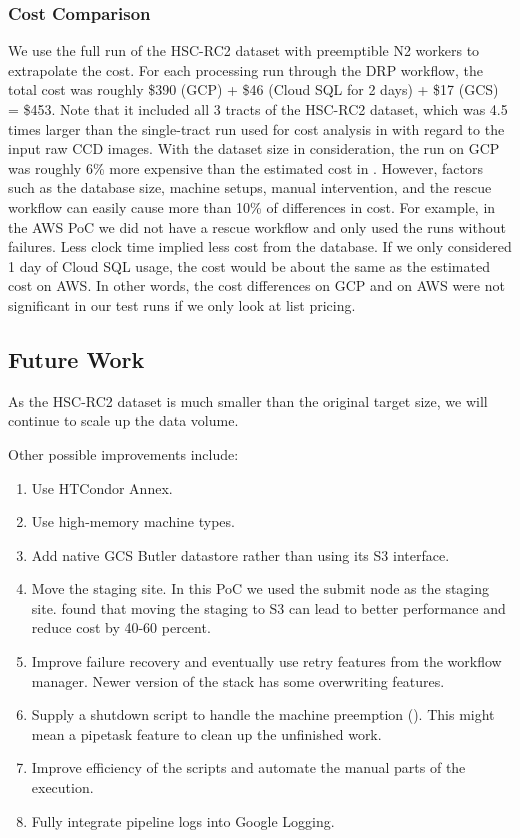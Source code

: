 \subsubsection{Cost Comparison}
We use the full run of the HSC-RC2 dataset with preemptible N2 workers to extrapolate the cost.
For each processing run through the DRP workflow, the total cost was roughly \$390 (GCP) + \$46 (Cloud SQL for 2 days) + \$17 (GCS) = \$453.
Note that it included all 3 tracts of the HSC-RC2 dataset, which was 4.5 times larger than the single-tract run used for cost analysis in  with regard to the input raw CCD images.
With the dataset size in consideration, the run on GCP was roughly 6\% more expensive than the estimated cost in .
However, factors such as the database size, machine setups, manual intervention, and the rescue workflow can easily cause more than 10\% of differences in cost.
For example, in the AWS PoC we did not have a rescue workflow and only used the runs without failures.
Less clock time implied less cost from the database.
If we only considered 1 day of Cloud SQL usage, the cost would be about the same as the estimated cost on AWS.
In other words, the cost differences on GCP and on AWS were not significant in our test runs if we only look at list pricing.

\subsection{Future Work} \label{sec:future}

As the HSC-RC2 dataset is much smaller than the original target size, we will continue to scale up the data volume.

Other possible improvements include:
\begin{enumerate}
\item Use HTCondor Annex.
\item Use high-memory machine types.
\item Add native GCS Butler datastore rather than using its S3 interface.
\item Move the staging site. In this PoC we used the submit node as the staging site. \citet{Bektesevic2020} found that moving the staging to S3 can lead to better performance and reduce cost by 40-60 percent.
\item Improve failure recovery and eventually use retry features from the workflow manager. Newer version of the stack has some overwriting features.
\item Supply a shutdown script to handle the machine preemption (). This might mean a pipetask feature to clean up the unfinished work.
\item Improve efficiency of the scripts and automate the manual parts of the execution.
\item Fully integrate pipeline logs into Google Logging.



\end{enumerate}

